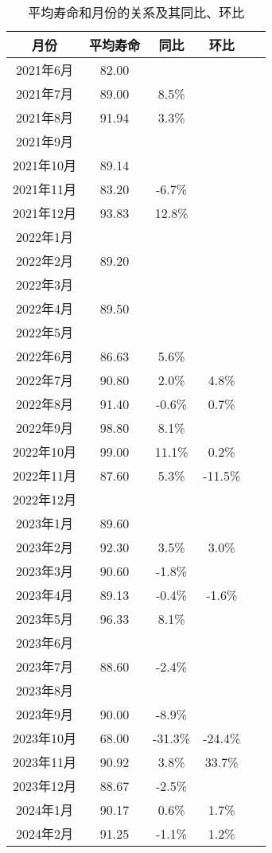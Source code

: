 \documentclass[twocolumn]{article}
\begin{document}
\begin{table}[!ht]
    \centering
    \begin{tabular}{c|c|c|c|c}
        \textbf{月份} & \textbf{平均寿命} & \textbf{同比} & \textbf{环比} & \textbf{} \\ \hline
        2021年6月 & 82.00 & ~ & ~ & ~ \\ 
        2021年7月 & 89.00 & 8.5\% & ~ & ~ \\ 
        2021年8月 & 91.94 & 3.3\% & ~ & ~ \\ 
        2021年9月 & ~ & ~ & ~ & ~ \\ 
        2021年10月 & 89.14 & ~ & ~ & ~ \\ 
        2021年11月 & 83.20 & -6.7\% & ~ & ~ \\ 
        2021年12月 & 93.83 & 12.8\% & ~ & ~ \\ 
        2022年1月 & ~ & ~ & ~ & ~ \\ 
        2022年2月 & 89.20 & ~ & ~ & ~ \\ 
        2022年3月 & ~ & ~ & ~ & ~ \\ 
        2022年4月 & 89.50 & ~ & ~ & ~ \\ 
        2022年5月 & ~ & ~ & ~ & ~ \\ 
        2022年6月 & 86.63 & 5.6\% & ~ & ~ \\ 
        2022年7月 & 90.80 & 2.0\% & 4.8\% & ~ \\ 
        2022年8月 & 91.40 & -0.6\% & 0.7\% & ~ \\ 
        2022年9月 & 98.80 & 8.1\% & ~ & ~ \\ 
        2022年10月 & 99.00 & 11.1\% & 0.2\% & ~ \\ 
        2022年11月 & 87.60 & 5.3\% & -11.5\% & ~ \\ 
        2022年12月 & ~ & ~ & ~ & ~ \\ 
        2023年1月 & 89.60 & ~ & ~ & ~ \\ 
        2023年2月 & 92.30 & 3.5\% & 3.0\% & ~ \\ 
        2023年3月 & 90.60 & -1.8\% & ~ & ~ \\ 
        2023年4月 & 89.13 & -0.4\% & -1.6\% & ~ \\ 
        2023年5月 & 96.33 & 8.1\% & ~ & ~ \\ 
        2023年6月 & ~ & ~ & ~ & ~ \\ 
        2023年7月 & 88.60 & -2.4\% & ~ & ~ \\ 
        2023年8月 & ~ & ~ & ~ & ~ \\ 
        2023年9月 & 90.00 & -8.9\% & ~ & ~ \\ 
        2023年10月 & 68.00 & -31.3\% & -24.4\% & ~ \\ 
        2023年11月 & 90.92 & 3.8\% & 33.7\% & ~ \\ 
        2023年12月 & 88.67 & -2.5\% & ~ & ~ \\ 
        2024年1月 & 90.17 & 0.6\% & 1.7\% & ~ \\ 
        2024年2月 & 91.25 & -1.1\% & 1.2\% & ~ \\ 
    \end{tabular}
    \caption{平均寿命和月份的关系及其同比、环比}
\end{table}
\end{document}
